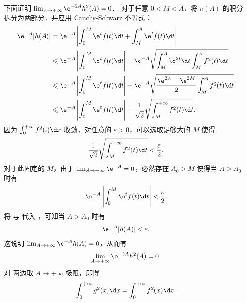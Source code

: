 \begin{myproof}
    下面证明 $\lim_{A\to+\infty} \e^{-2A} h^2(A) = 0$．
    对于任意 $0 < M < A$，将 $h(A)$ 的积分拆分为两部分，并应用 Cauchy-Schwarz 不等式：
    \begin{equation}\label{eq:q15-cs-split-8}
        \begin{aligned}
            \e^{-A} |h(A)|
             & = \e^{-A} \left| \int_0^M \e^t f(t) \d t + \int_M^A \e^t f(t) \d t \right|                                                   \\
             & \leqslant \e^{-A} \left| \int_0^M \e^t f(t) \d t \right| + \e^{-A} \sqrt{ \int_M^A \e^{2t} \d t \int_M^A f^2(t) \d t }       \\
             & \leqslant \e^{-A} \left| \int_0^M \e^t f(t) \d t \right| + \e^{-A} \sqrt{ \frac{\e^{2A} - \e^{2M}}{2} \int_M^A f^2(t) \d t } \\
             & \leqslant \e^{-A} \left| \int_0^M \e^t f(t) \d t \right| + \frac{1}{\sqrt{2}} \sqrt{ \int_M^{+\infty} f^2(t) \d t }.
        \end{aligned}
    \end{equation}
    因为 $\int_0^{+\infty} f^2(t) \d x$ 收敛，对任意的 $\varepsilon > 0$，可以选取足够大的 $M$ 使得
    \begin{equation}\label{eq:q15-tail-9}
        \frac{1}{\sqrt{2}} \sqrt{ \int_M^{+\infty} f^2(t) \d t } < \frac{\varepsilon}{2}.
    \end{equation}
    对于此固定的 $M$，由于 $\lim_{A\to+\infty} \e^{-A} = 0$，必然存在 $A_0 > M$ 使得当 $A > A_0$ 时有
    \begin{equation}\label{eq:q15-head-10}
        \e^{-A} \left| \int_0^M \e^t f(t) \d t \right| < \frac{\varepsilon}{2}.
    \end{equation}
    将  与  代入 ，可知当 $A > A_0$ 时有
    \begin{equation}\label{eq:q15-limit-final-11}
        \e^{-A} |h(A)| < \varepsilon.
    \end{equation}
    这说明 $\lim_{A\to+\infty} \e^{-A} h(A) = 0$，从而有
    \begin{equation}\label{eq:q15-limit-zero-12}
        \lim_{A\to+\infty} \e^{-2A} h^2(A) = 0.
    \end{equation}
    对  两边取 $A \to +\infty$ 极限，即得
    \begin{equation}\label{eq:q15-final-13}
        \int_0^{+\infty} g^2(x) \d x = \int_0^{+\infty} f^2(x) \d x.
    \end{equation}
\end{myproof}

\endinput
